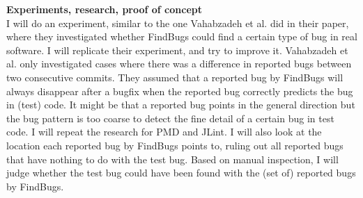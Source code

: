 \documentclass{uvamscse}
\newcommand{\Atestbugs}{Vahabzadeh et al.}
\begin{document}
\textbf{Experiments, research, proof of concept}\\
I will do an experiment, similar to the one \Atestbugs{} did in their paper, where they investigated whether FindBugs could find a certain type of bug in real software. I will replicate their experiment, and try to improve it. \Atestbugs{} only investigated cases where there was a difference in reported bugs between two consecutive commits. They assumed that a reported bug by FindBugs will always disappear after a bugfix when the reported bug correctly predicts the bug in (test) code. It might be that a reported bug points in the general direction but the bug pattern is too coarse to detect the fine detail of a certain bug in test code. I will repeat the research for PMD and  JLint. I will also look at the location each reported bug by FindBugs points to, ruling out all reported bugs that have nothing to do with the test bug. Based on manual inspection, I will judge whether the test bug could have been found with the (set of) reported bugs by FindBugs. 
\end{document}
